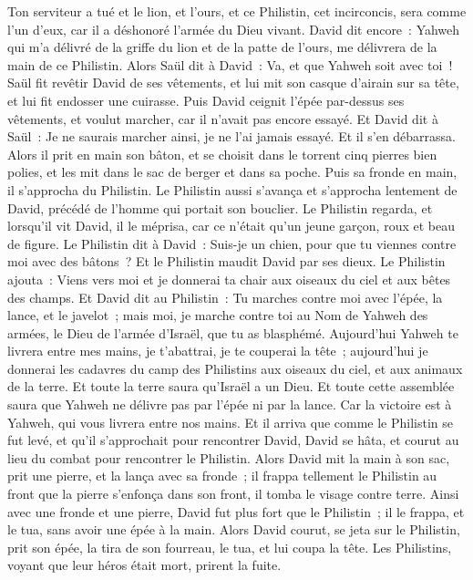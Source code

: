 \begin{multicols}{2}
Ton serviteur a tué et le lion, et l'ours, et ce Philistin, cet incirconcis, sera comme l'un d'eux, car il a déshonoré l'armée du Dieu vivant.
David dit encore~: Yahweh qui m'a délivré de la griffe du lion et de la patte de l'ours, me délivrera de la main de ce Philistin. Alors Saül dit à David~: Va, et que Yahweh soit avec toi~!
Saül fit revêtir David de ses vêtements, et lui mit son casque d'airain sur sa tête, et lui fit endosser une cuirasse.
Puis David ceignit l'épée par-dessus ses vêtements, et voulut marcher, car il n'avait pas encore essayé. Et David dit à Saül~: Je ne saurais marcher ainsi, je ne l'ai jamais essayé. Et il s'en débarrassa.
Alors il prit en main son bâton, et se choisit dans le torrent cinq pierres bien polies, et les mit dans le sac de berger et dans sa poche. Puis sa fronde en main, il s'approcha du Philistin.
Le Philistin aussi s'avança et s'approcha lentement de David, précédé de l'homme qui portait son bouclier.
Le Philistin regarda, et lorsqu'il vit David, il le méprisa, car ce n'était qu'un jeune garçon, roux et beau de figure.
Le Philistin dit à David~: Suis-je un chien, pour que tu viennes contre moi avec des bâtons~? Et le Philistin maudit David par ses dieux.
Le Philistin ajouta~: Viens vers moi et je donnerai ta chair aux oiseaux du ciel et aux bêtes des champs.
Et David dit au Philistin~: Tu marches contre moi avec l'épée, la lance, et le javelot~; mais moi, je marche contre toi au Nom de Yahweh des armées, le Dieu de l'armée d'Israël, que tu as blasphémé.
Aujourd'hui Yahweh te livrera entre mes mains, je t'abattrai, je te couperai la tête~; aujourd'hui je donnerai les cadavres du camp des Philistins aux oiseaux du ciel, et aux animaux de la terre. Et toute la terre saura qu'Israël a un Dieu.
Et toute cette assemblée saura que Yahweh ne délivre pas par l'épée ni par la lance. Car la victoire est à Yahweh, qui vous livrera entre nos mains.
Et il arriva que comme le Philistin se fut levé, et qu'il s'approchait pour rencontrer David, David se hâta, et courut au lieu du combat pour rencontrer le Philistin.
Alors David mit la main à son sac, prit une pierre, et la lança avec sa fronde~; il frappa tellement le Philistin au front que la pierre s'enfonça dans son front, il tomba le visage contre terre.
Ainsi avec une fronde et une pierre, David fut plus fort que le Philistin~; il le frappa, et le tua, sans avoir une épée à la main.
Alors David courut, se jeta sur le Philistin, prit son épée, la tira de son fourreau, le tua, et lui coupa la tête. Les Philistins, voyant que leur héros était mort, prirent la fuite.

\end{multicols}
